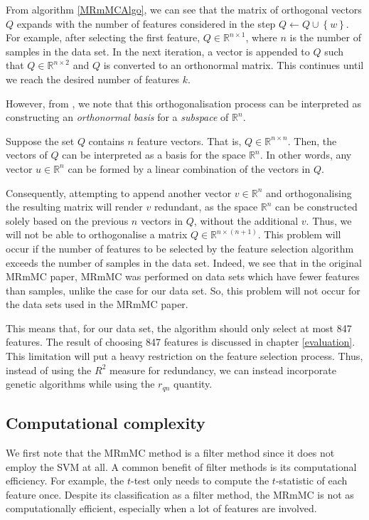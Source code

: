 \documentclass[12pt, twoside, a4paper]{report}
\begin{document}
From algorithm \ref{MRmMCAlgo}, we can see that the matrix of orthogonal vectors $Q$ expands with the number of features considered in the step $Q \longleftarrow Q \cup \left\lbrace w \right\rbrace$. For example, after selecting the first feature, $Q \in \mathbb{R}^{n \times 1}$, where $n$ is the number of samples in the data set. In the next iteration, a vector is appended to $Q$ such that $Q \in \mathbb{R}^{n \times 2}$ and $Q$ is converted to an orthonormal matrix. This continues until we reach the desired number of features $k$.

However, from \cite{RefWorks:253}, we note that this orthogonalisation process can be interpreted as constructing an \textit{orthonormal basis} for a \textit{subspace} of $\mathbb{R}^{n}$.

Suppose the set $Q$ contains $n$ feature vectors. That is, $Q \in \mathbb{R}^{n \times n}$. Then, the vectors of $Q$ can be interpreted as a basis for the space $\mathbb{R}^{n}$. In other words, any vector $u \in \mathbb{R}^{n}$ can be formed by a linear combination of the vectors in $Q$.

Consequently, attempting to append another vector $v \in \mathbb{R}^{n}$ and orthogonalising the resulting matrix will render $v$ redundant, as the space $\mathbb{R}^{n}$ can be constructed solely based on the previous $n$ vectors in $Q$, without the additional $v$. Thus, we will not be able to orthogonalise a matrix $Q \in \mathbb{R}^{n \times (n+1)}$. This problem will occur if the number of features to be selected by the feature selection algorithm exceeds the number of samples in the data set. Indeed, we see that in the original MRmMC paper, MRmMC was performed on data sets which have fewer features than samples, unlike the case for our data set. So, this problem will not occur for the data sets used in the MRmMC paper.

This means that, for our data set, the algorithm should only select at most 847 features. The result of choosing 847 features is discussed in chapter \ref{evaluation}. This limitation will put a heavy restriction on the feature selection process. Thus, instead of using the $R^2$ measure for redundancy, we can instead incorporate genetic algorithms while using the $r_{qn}$ quantity.

\subsection{Computational complexity}

We first note that the MRmMC method is a filter method since it does not employ the SVM at all. A common benefit of filter methods is its computational efficiency. For example, the $t$-test only needs to compute the $t$-statistic of each feature once. Despite its classification as a filter method, the MRmMC is not as computationally efficient, especially when a lot of features are involved.
\end{document}
